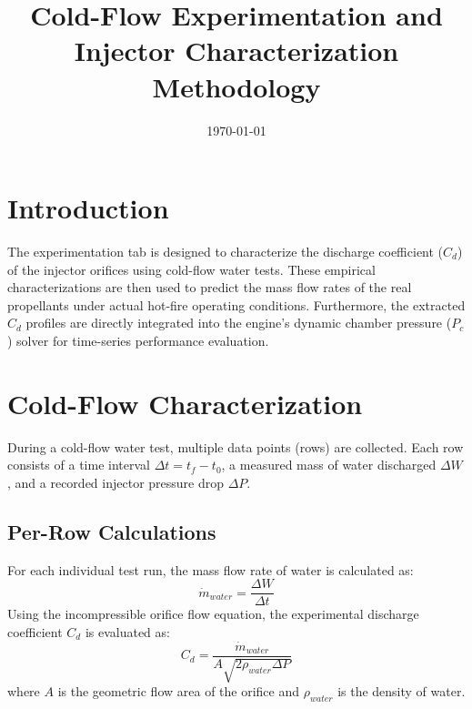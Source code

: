 \documentclass[12pt]{article}
\title{Cold-Flow Experimentation and Injector Characterization Methodology}
\author{}
\date{\today}
\begin{document}
\maketitle

\section{Introduction}
The experimentation tab is designed to characterize the discharge coefficient ($C_d$) of the injector orifices using cold-flow water tests. These empirical characterizations are then used to predict the mass flow rates of the real propellants under actual hot-fire operating conditions. Furthermore, the extracted $C_d$ profiles are directly integrated into the engine's dynamic chamber pressure ($P_c$) solver for time-series performance evaluation.

\section{Cold-Flow Characterization}
During a cold-flow water test, multiple data points (rows) are collected. Each row consists of a time interval $\Delta t = t_f - t_0$, a measured mass of water discharged $\Delta W$, and a recorded injector pressure drop $\Delta P$.

\subsection{Per-Row Calculations}
For each individual test run, the mass flow rate of water is calculated as:
\begin{equation}
\dot{m}_{water} = \frac{\Delta W}{\Delta t}
\end{equation}
Using the incompressible orifice flow equation, the experimental discharge coefficient $C_d$ is evaluated as:
\begin{equation}
C_d = \frac{\dot{m}_{water}}{A \sqrt{2 \rho_{water} \Delta P}}
\end{equation}
where $A$ is the geometric flow area of the orifice and $\rho_{water}$ is the density of water.
\end{document}
